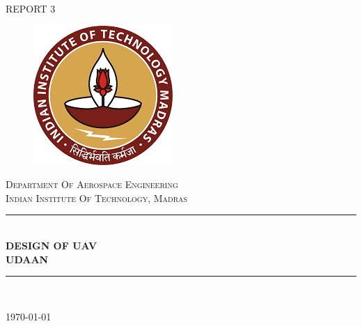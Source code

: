 \begin{titlepage} %
	\newcommand{\HRule}{\rule{\linewidth}{0.5mm}} %
	
	\center %
	
	
	\textsc{\LARGE REPORT 3}\\[1 cm] %
	\begin{figure}[h!]
\centering
\includegraphics[scale=1]{IITM.png}
\label{fig:boat}
\end{figure} 

	 	\textsc{\large Department Of Aerospace Engineering}\\[0.5cm] %
	
	\textsc{\Large Indian Institute Of Technology, Madras}\\[0.5cm] %
	
		\HRule\\[0.4cm]
	
	{\huge\bfseries DESIGN OF UAV}\\[0.4cm] %
	{\large\bfseries UDAAN}\\
	\HRule\\[1.5cm]
	
	
	\vfill\vfill\vfill %
	
	{\large\today} %
	

\end{titlepage}
